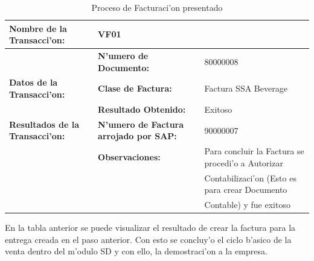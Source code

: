 \begin{table}[H]
\footnotesize
\scalebox{0.8} {
\begin{tabular}{l l l}
\toprule
\textbf{Nombre de la Transacci'on:} & VF01 &\\
\midrule
                 & \textbf{N'umero de Documento:} &  80000008 \\
                 \cmidrule{2-3}
  \textbf{Datos de la Transacci'on:}                  & \textbf{Clase de Factura:} & Factura SSA Beverage \\
                 \midrule
                 & \textbf{Resultado Obtenido:} & Exitoso \\
                 \cmidrule{2-3}
\textbf{Resultados de la Transacci'on:}    & \textbf{N'umero de Factura arrojado por SAP:} & 90000007 \\
                 \cmidrule{2-3}
                 & \textbf{Observaciones:} &  Para concluir la Factura se procedi'o a Autorizar \\
                 &                                      & Contabilizaci'on (Esto es para crear Documento \\
                 &                                      & Contable) y fue exitoso\\
                 \bottomrule
\end{tabular}}
\caption{Proceso de Facturaci'on presentado}
\label{tb:facturacion}
\end{table}
	En la tabla anterior se puede visualizar el resultado de crear la factura para la entrega creada en el paso anterior. Con esto se concluy'o el ciclo b'asico de la venta dentro del m'odulo SD y con ello, la demostraci'on a la empresa.
